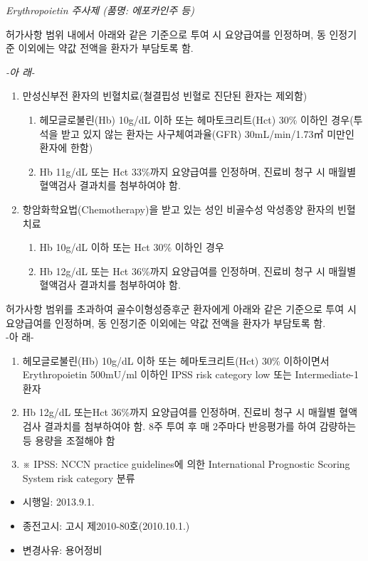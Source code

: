 \begin{commentbox}{}
\emph{Erythropoietin 주사제 (품명: 에포카인주 등)}\par
허가사항 범위 내에서 아래와 같은 기준으로 투여 시 요양급여를 인정하며, 동 인정기준 이외에는 약값 전액을 환자가 부담토록 함.\\
\begin{center}\emph{-아 래-}\end{center}
\begin{enumerate}[가.]\tightlist
\item 만성신부전 환자의 빈혈치료(철결핍성 빈혈로 진단된 환자는 제외함)
	\begin{enumerate}[1)]\tightlist
	\item 헤모글로불린(Hb) 10g/dL 이하 또는 헤마토크리트(Hct) 30\% 이하인 경우(투석을 받고 있지 않는 환자는 사구체여과율(GFR) 30mL/min/1.73㎡ 미만인 환자에 한함)
	\item Hb 11g/dL 또는 Hct 33\%까지 요양급여를 인정하며, 진료비 청구 시 매월별 혈액검사 결과치를 첨부하여야 함.
	\end{enumerate}
\item 항암화학요법(Chemotherapy)을 받고 있는 성인 비골수성 악성종양 환자의 빈혈치료
	\begin{enumerate}[1)]\tightlist
	\item Hb 10g/dL 이하 또는 Hct 30\% 이하인 경우
	\item Hb 12g/dL 또는 Hct 36\%까지 요양급여를 인정하며, 진료비 청구 시 매월별 혈액검사 결과치를 첨부하여야 함.
	\end{enumerate}
\end{enumerate}
허가사항 범위를 초과하여 골수이형성증후군 환자에게 아래와 같은 기준으로 투여 시 요양급여를 인정하며, 동 인정기준 이외에는 약값 전액을 환자가 부담토록 함. \\
-아 래-
\begin{enumerate}[가.]\tightlist
\item 헤모글로불린(Hb) 10g/dL 이하 또는 헤마토크리트(Hct) 30\% 이하이면서 Erythropoietin 500mU/ml 이하인 IPSS risk category low 또는 Intermediate-1 환자
\item Hb 12g/dL 또는Hct 36\%까지 요양급여를 인정하며, 진료비 청구 시 매월별 혈액검사 결과치를 첨부하여야 함. 8주 투여 후 매 2주마다 반응평가를 하여 감량하는 등 용량을 조절해야 함
\item ※ IPSS: NCCN practice guidelines에 의한 International Prognostic Scoring System risk category 분류
\end{enumerate} 

\begin{itemize}[*]
\item 시행일: 2013.9.1.
\item 종전고시: 고시 제2010-80호(2010.10.1.)
\item 변경사유: 용어정비
\end{itemize}
\end{commentbox}

